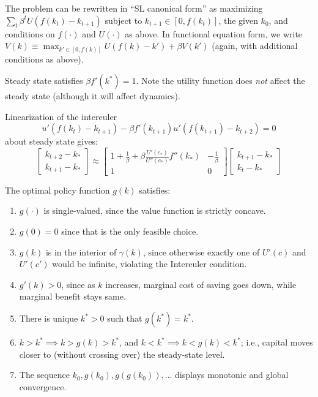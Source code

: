\documentclass[8pt,letterpaper, landscape]{extarticle} %
\begin{document}
\begin{multicols}{3}
\begin{description}
The problem can be rewritten in ``SL canonical form'' as maximizing $ \sum_{t} \beta^t U(f(k_t) - k_{t+1}) $ subject to $ k_{t+1} \in [0, f(k_t)] $, the given $ k_0 $, and conditions on $ f(\cdot) $ and $ U(\cdot) $ as above. In functional equation form, we write $ V(k) \equiv \max_{k' \in [0, f(k)]} U(f(k) - k') + \beta V(k') $ (again, with additional conditions as above).

Steady state satisfies $ \beta f' (k^*) = 1 $. Note the utility function does \textit{not} affect the steady state (although it will affect dynamics).

Linearization of the intereuler
\[ u'(f(k_t) - k_{t+1}) - \beta f' (k_{t+1}) u' (f(k_{t+1}) - k_{t+2}) = 0 \]
about steady state gives:
$$ 
\begin{bmatrix}
k_{t+2} - k_* \\ 
k_{t+1} - k_*
\end{bmatrix}
\approx
\begin{bmatrix}
1 + \frac{1}{\beta} + \beta \frac{U'(c_*)}{U''(c_*)} f''(k_*) & -\frac{1}{\beta} \\ 
1 & 0
\end{bmatrix}
\begin{bmatrix}
k_{t+1} - k_* \\ 
k_{t} - k_*
\end{bmatrix}
 $$

The optimal policy function $ g(k) $ satisfies:
\begin{enumerate}
\item $ g(\cdot) $ is single-valued, since the value function is strictly concave.
\item $ g(0) = 0 $ since that is the only feasible choice.
\item $ g(k) $ is in the interior of $ \gamma(k) $, since otherwise exactly one of $ U'(c) $ and $ U'(c') $ would be infinite, violating the Intereuler condition.
\item $ g'(k) > 0 $, since as $ k $ increases, marginal cost of saving goes down, while marginal benefit stays same.
\item There is unique $ k^* >0$ such that $ g(k^*) = k^* $.
\item $ k > k^* \implies k > g(k) > k^* $, and $ k < k^* \implies k < g(k) < k^* $; i.e., capital moves closer to (without crossing over) the steady-state level.
\item The sequence $ k_0, g(k_0), g(g(k_0)), \dotsc $ displays monotonic and global convergence.
\end{enumerate}


\end{description}
\end{multicols}
\end{document}
